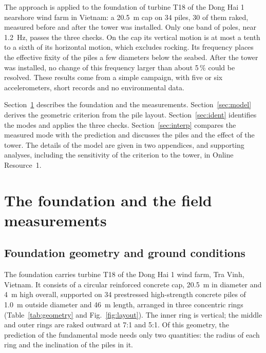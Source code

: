 \documentclass[11pt]{article}
\begin{document}
The approach is applied to the foundation of turbine T18 of the Dong Hai 1 nearshore wind farm in Vietnam: a 20.5~m cap on 34 piles, 30 of them raked, measured before and after the tower was installed. Only one band of poles, near 1.2~Hz, passes the three checks. On the cap its vertical motion is at most a tenth to a sixth of its horizontal motion, which excludes rocking. Its frequency places the effective fixity of the piles a few diameters below the seabed. After the tower was installed, no change of this frequency larger than about 5\,\% could be resolved. These results come from a simple campaign, with five or six accelerometers, short records and no environmental data.

Section~\ref{sec:structure} describes the foundation and the measurements. Section~\ref{sec:model} derives the geometric criterion from the pile layout. Section~\ref{sec:ident} identifies the modes and applies the three checks. Section~\ref{sec:interp} compares the measured mode with the prediction and discusses the piles and the effect of the tower. The details of the model are given in two appendices, and supporting analyses, including the sensitivity of the criterion to the tower, in Online Resource~1.

\section{The foundation and the field measurements}
\label{sec:structure}

\subsection{Foundation geometry and ground conditions} \label{sec:geometry}

The foundation carries turbine T18 of the Dong Hai 1 wind farm, Tra Vinh,
Vietnam. It consists of a circular reinforced concrete cap, 20.5~m in diameter
and 4~m high overall, supported on 34 prestressed high-strength concrete piles of 1.0~m
outside diameter and 46~m length, arranged in three concentric rings
(Table~\ref{tab:geometry} and Fig.~\ref{fig:layout}). The inner ring is
vertical; the middle and outer rings are raked outward at 7:1 and 5:1. Of this
geometry, the prediction of the fundamental mode needs only two quantities: the
radius of each ring and the inclination of the piles in it.
\end{document}
